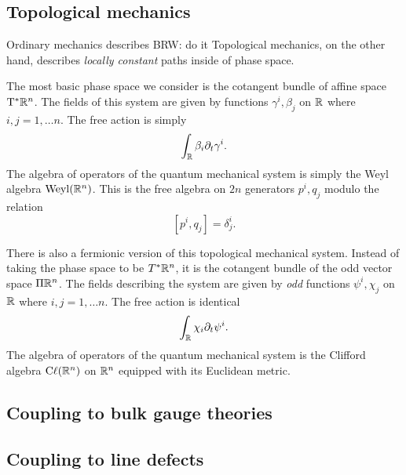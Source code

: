 \documentclass[11pt]{amsart}
\def\Weyl{{\rm Weyl}}
\def\Cl{{\rm C}\ell}
\def\brian#1{{\textcolor{blue!65!red}{BRW: {#1}}}}
\begin{document}

\subsection*{Topological mechanics}


Ordinary mechanics describes \brian{do it}
Topological mechanics, on the other hand, describes {\em locally constant} paths inside of phase space.

The most basic phase space we consider is the cotangent bundle of affine space ${\rm T}^* \mathbb R^n$.
The fields of this system are given by functions $\gamma^i, \beta_j$ on $\mathbb R$ where $i,j=1,\ldots n$. 
The free action is simply
\[
\int_\mathbb R \beta_i \partial_t \gamma^i .
\]
The algebra of operators of the quantum mechanical system is simply the Weyl algebra $\Weyl(\RR^n)$.
This is the free algebra on $2n$ generators $p^i, q_j$ modulo the relation
\[
[p^i, q_j] = \delta^i_j .
\]

There is also a fermionic version of this topological mechanical system. 
Instead of taking the phase space to be $T^* \mathbb R^n$, it is the cotangent bundle of the odd vector space $\Pi \mathbb R^n$.
The fields describing the system are given by {\em odd} functions $\psi^i, \chi_j$ on $\mathbb R$ where $i,j=1,\ldots n$. 
The free action is identical
\[
\int_\mathbb R \chi_i \partial_t \psi^i .
\]
The algebra of operators of the quantum mechanical system is the Clifford algebra $\Cl(\RR^n)$ on $\mathbb R^n$ equipped with its Euclidean metric. 



\subsection*{Coupling to bulk gauge theories}

\subsection{Coupling to line defects} 
\end{document}
